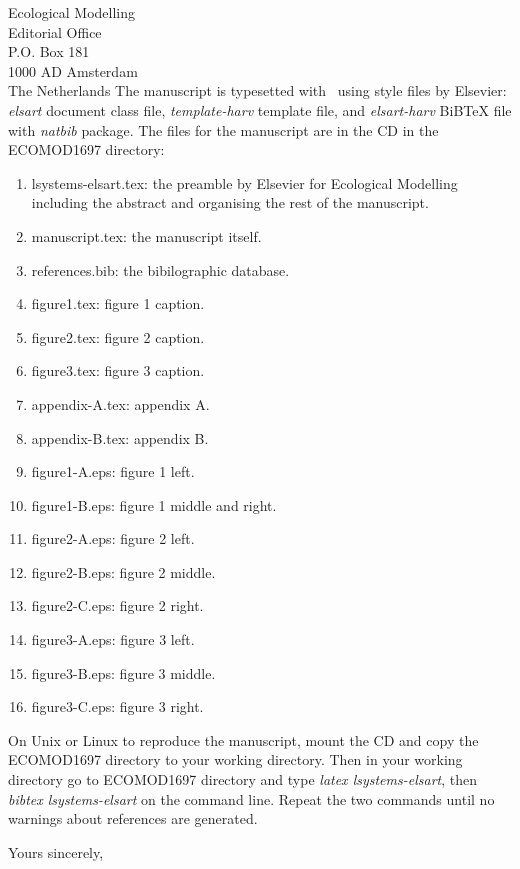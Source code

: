 \documentclass{letter}
\begin{document}
\begin{letter}{ Ecological Modelling \\ Editorial Office \\
               P.O. Box 181 \\ 1000 AD Amsterdam \\ The Netherlands}
The  manuscript  is typesetted  with  \LaTeXe\  using  style files  by
Elsevier: \textsl{elsart}  document class file, \textsl{template-harv}
template   file,    and   \textsl{elsart-harv}   BiBTeX    file   with
\textsl{natbib} package.
\newpage
The files for the manuscript are in the CD in the ECOMOD1697 directory:

\begin{enumerate}
\item  lsystems-elsart.tex: the  preamble by  Elsevier  for Ecological
  Modelling  including the  abstract and  organising the  rest  of the
  manuscript.
\item manuscript.tex: the manuscript itself.
\item references.bib: the bibilographic database.
\item figure1.tex: figure 1 caption.
\item figure2.tex: figure 2 caption.
\item figure3.tex: figure 3 caption.
\item appendix-A.tex: appendix A.
\item appendix-B.tex: appendix B.
\item figure1-A.eps: figure 1 left.
\item figure1-B.eps: figure 1 middle and right.
\item figure2-A.eps: figure 2 left.
\item figure2-B.eps: figure 2 middle.
\item figure2-C.eps: figure 2 right.
\item figure3-A.eps: figure 3 left.
\item figure3-B.eps: figure 3 middle.
\item figure3-C.eps: figure 3 right.
\end{enumerate}

On Unix  or Linux to reproduce  the manuscript, mount the  CD and copy
the  ECOMOD1697 directory  to your  working directory.   Then  in your
working directory  go to  ECOMOD1697 directory and  type \textsl{latex
  lsystems-elsart},   then  \textsl{bibtex  lsystems-elsart}   on  the
command  line.   Repeat  the  two  commands until  no  warnings  about
references are generated.

\closing{Yours sincerely,}
\end{letter}
\end{document}
